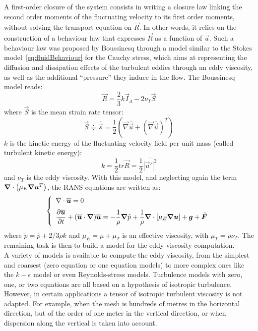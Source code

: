 A first-order closure of the system consists in writing a closure law linking the second order moments of the fluctuating velocity to its first order moments,
without solving the transport equation on $\vec R$.
In other words, it relies on the construction of a behaviour law that expresses $\vec{R}$ as a function of $\overline{\vec{u}}$.
Such a behaviour law was proposed by Boussinesq through a model similar to the Stokes model~\eqref{eq:fluidBehaviour} for the Cauchy stress, which aims at representing the
diffusion and dissipation effects of the turbulent eddies through an eddy viscosity, as well as the additional ``pressure'' they induce in the flow. The Boussinesq model reads:
\begin{equation}\label{eq:Boussinesq}
  \vec{R} = \dfrac{2}{3}k\vec{I}_d-2\nu_T\vec S
\end{equation}
where $\vec S$ is the mean strain rate tensor:
\begin{equation}\label{eq:meanS}
  \vec S \doteqdot \overline{\vec s} = \dfrac{1}{2}\left(\vec\nabla \overline{\vec{u}} + (\vec\nabla \overline{\vec{u}})^T\right)
\end{equation}
$k$ is the kinetic energy of the fluctuating velocity field per unit mass (called turbulent kinetic energy):
\begin{equation}
  k=\dfrac{1}{2} tr \vec R=\dfrac{1}{2}\overline{|\vec{u}'|^2}
\end{equation}
and $\nu_T$ is the eddy viscosity.
With this model, and neglecting again the term $\bm{\nabla} \cdot \left(\mu_E\bm{\nabla} \bm{u}^T\right)$, the RANS equations are written as:
\begin{equation}\label{eq:Reynolds_k}
  \left\{
    \begin{array}{l}
      \nabla \cdot \overline{\vec{u}} = 0 \medskip \\
      \dfrac{\partial \overline{\vec{u}} }{\partial t} + (\overline{\vec{u}} \cdot \Grad)\overline{\vec{u}}=-\dfrac{1}{\rho} \vec{\nabla} \tilde p + \dfrac{1}{\rho} \vec{\nabla} \cdot \left[\mu_E\Grad \vec{u}\right]+ \vec{g} + \tilde{\vec{F}}\\
    \end{array}
  \right.
\end{equation}
where $\tilde p = \overline{p}+2/3 \rho k$ and $\mu_E=\mu+\mu_T$ is an effective viscosity, with $\mu_T = \rho \nu_T$.
The remaining task is then to build a model for the eddy viscosity computation.\\

A variety of models is available to compute the eddy viscosity, from the simplest and coarsest
(zero equation or one equation models) to more complex ones like the $k-\epsilon$ model or even
Reynolds-stress models.
Turbulence models with zero, one, or two equations are all based on a
hypothesis of isotropic turbulence. However, in certain applications a tensor
of isotropic turbulent viscosity is not adapted. For example, when the mesh is
hundreds of metres in the horizontal direction, but of the order of one meter in
the vertical direction, or when dispersion along the vertical is taken into account.

